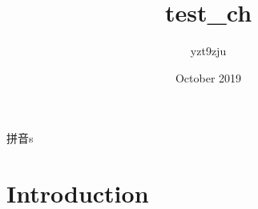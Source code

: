 \documentclass{article}
\title{test\_ch}
\author{yzt9zju }
\date{October 2019}
\begin{document}
\maketitle

拼音s

\section{Introduction}
\end{document}
